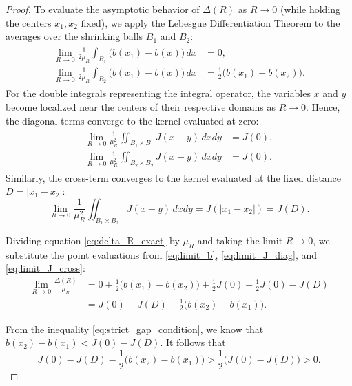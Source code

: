 \documentclass[11pt, a4paper]{article}
\theoremstyle{break}
\theoremstyle{break}
\theoremstyle{break}
\theoremstyle{break}
\theoremstyle{break}
\theoremstyle{break}
\theoremstyle{break}
\theoremstyle{break}
\theoremstyle{break}
\begin{document}
\begin{proof}
To evaluate the asymptotic behavior of $\Delta(R)$ as $R \to 0$ (while holding the centers $x_1, x_2$ fixed), we apply the Lebesgue Differentiation Theorem to the averages over the shrinking balls $B_1$ and $B_2$:
\begin{align} 
    \begin{split}
        \label{eq:limit_b}
        \lim_{R \to 0} \frac{1}{2\mu_R} \int_{B_1} \big( b(x_1) - b(x) \big) \, dx &= 0, \\
        \lim_{R \to 0} \frac{1}{2\mu_R} \int_{B_2} \big( b(x_1) - b(x) \big) \, dx &= \frac{1}{2} \big( b(x_1) - b(x_2) \big).
    \end{split}
\end{align}
For the double integrals representing the integral operator, the variables $x$ and $y$ become localized near the centers of their respective domains as $R \to 0$. Hence, the diagonal terms converge to the kernel evaluated at zero:
\begin{align} 
    \begin{split}
        \label{eq:limit_J_diag}
        \lim_{R \to 0} \frac{1}{\mu_R^2} \iint_{B_1 \times B_1} J(x-y) \, dx dy &= J(0), \\
        \lim_{R \to 0} \frac{1}{\mu_R^2} \iint_{B_2 \times B_2} J(x-y) \, dx dy &= J(0).
    \end{split}
\end{align}
Similarly, the cross-term converges to the kernel evaluated at the fixed distance $D = |x_1 - x_2|$:
\begin{equation} 
    \label{eq:limit_J_cross}
    \lim_{R \to 0} \frac{1}{\mu_R^2} \iint_{B_1 \times B_2} J(x-y) \, dx dy = J(|x_1 - x_2|) = J(D).
\end{equation}

Dividing equation \eqref{eq:delta_R_exact} by $\mu_R$ and taking the limit $R \to 0$, we substitute the point evaluations from \eqref{eq:limit_b}, \eqref{eq:limit_J_diag}, and \eqref{eq:limit_J_cross}:
\begin{align} 
    \label{eq:delta_limit}
    \lim_{R \to 0} \frac{\Delta(R)}{\mu_R} 
    &= 0 + \frac{1}{2} \big( b(x_1) - b(x_2) \big) + \frac{1}{2} J(0) + \frac{1}{2} J(0) - J(D) \nonumber \\
    &= J(0) - J(D) - \frac{1}{2} \big( b(x_2) - b(x_1) \big).
\end{align}

From the inequality \eqref{eq:strict_gap_condition}, we know that $b(x_2) - b(x_1) < J(0) - J(D)$. It follows that
\begin{equation}
    J(0) - J(D) - \frac{1}{2} \big( b(x_2) - b(x_1) \big) > \frac{1}{2} \big( J(0) - J(D) \big) > 0.
\end{equation}


\end{proof}
\end{document}
